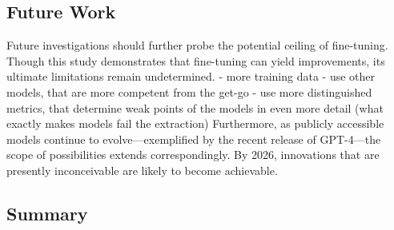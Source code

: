 \subsection{Future Work}\label{sec:future_work}
Future investigations should further probe the potential ceiling of fine-tuning. Though this study demonstrates that fine-tuning can yield improvements, its ultimate limitations remain undetermined. 
- more training data
- use other models, that are more competent from the get-go
- use more distinguished metrics, that determine weak points of the models in even more detail (what exactly makes models fail the extraction)
Furthermore, as publicly accessible models continue to evolve—exemplified by the recent release of GPT-4—the scope of possibilities extends correspondingly. By 2026, innovations that are presently inconceivable are likely to become achievable.

\subsection{Summary}\label{sec:summary}
